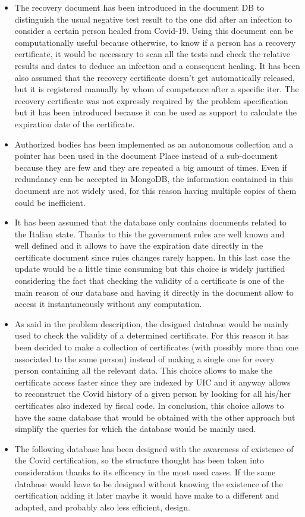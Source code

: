 \documentclass{article}
\begin{document}
\begin{itemize}

\item The recovery document has been introduced in the document DB to distinguish the usual negative test result to the one did after an infection to consider a certain person healed from Covid-19. Using this document can be computationally useful because otherwise, to know if a person has a recovery certificate, it would be necessary to scan all the tests and check the relative results and dates to deduce an infection and a consequent healing. It has been also assumed that the recovery certificate doesn't get automatically released, but it is registered manually by whom of competence after a specific iter. The recovery certificate was not expressly required by the problem specification but it has been introduced because it can be used as support to calculate the expiration date of the certificate.
\item Authorized bodies has been implemented as an autonomous collection and a pointer has been used in the document Place instead of a sub-document because they are few and they are repeated a big amount of times. Even if redundancy can be accepted in MongoDB, the information contained in this document are not widely used, for this reason having multiple copies of them could be inefficient.
\item It has been assumed that the database only contains documents related to the Italian state. Thanks to this the government rules are well known and well defined and it allows to have the expiration date directly in the certificate document since rules changes rarely happen. In this last case the update would be a little time consuming but this choice is widely justified considering the fact that checking the validity of a certificate is one of the main reason of our database and having it directly in the document allow to access it instantaneously without any computation.
\item As said in the problem description, the designed database would be mainly used to check the validity of a determined certificate. For this reason it has been decided to make a collection of certificates (with possibly more than one associated to the same person) instead of making a single one for every person containing all the relevant data. This choice allows to make the certificate access faster since they are indexed by UIC and it anyway allows to reconstruct the Covid history of a given person by looking for all his/her certificates also indexed by fiscal code. In conclusion, this choice allows to have the same database that would be obtained with the other approach but simplify the queries for which the database would be mainly used.
\item The following database has been designed with the awareness of existence of the Covid certification, so the structure thought has been taken into consideration thanks to its efficency in the most used cases. If the same database would have to be designed without knowing the existence of the certification adding it later maybe it would have make to a different and adapted, and probably also less efficient, design.

\end{itemize}
\newpage
\end{document}
